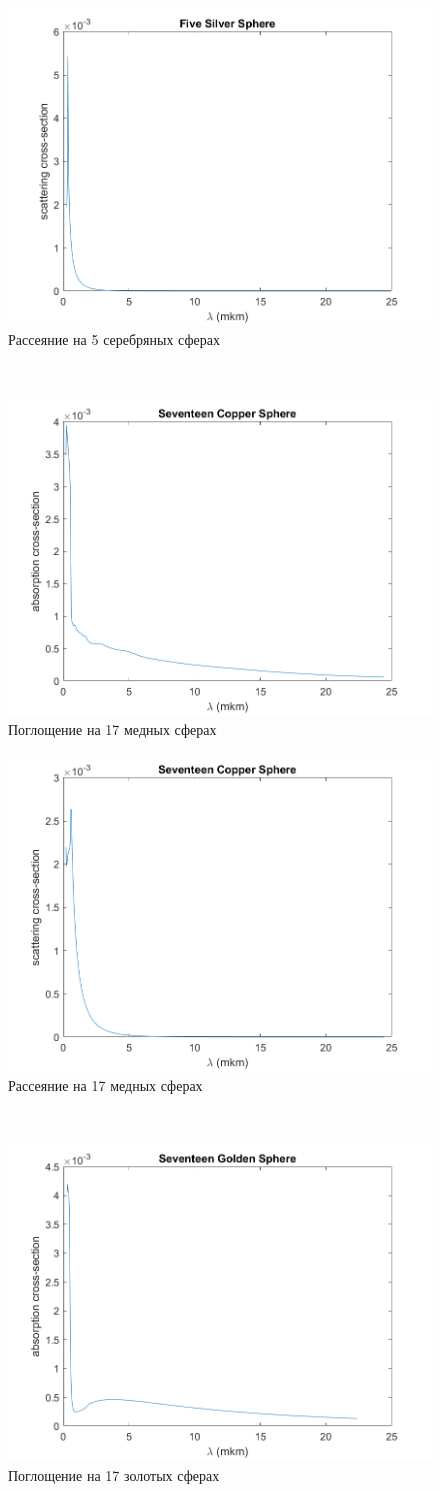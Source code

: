 \begin{figure}[h!]
	\centering
	\includegraphics[width=0.5\linewidth]{fiveSilverSphereCrossSection}
	\caption{Рассеяние на 5 серебряных сферах}
	\label{fig:fiveSilverSphereCrossSection}
\end{figure} \\
\begin{figure}[h!]
	\centering
	\includegraphics[width=0.5\linewidth]{seventeenCopperSphereAbsorptionSection}
	\caption{Поглощение на 17 медных сферах}
	\label{fig:seventeenCopperSphereAbsorptionSection}
\end{figure} 
\begin{figure}[h!]
	\centering
	\includegraphics[width=0.5\linewidth]{seventeenCopperSphereCrossSection}
	\caption{Рассеяние на 17 медных сферах}
	\label{fig:seventeenCopperSphereCrossSection}
\end{figure} \\
\begin{figure}[h!]
	\centering
	\includegraphics[width=0.5\linewidth]{seventeenGoldSphereAbsorptionSection}
	\caption{Поглощение на 17 золотых сферах}
	\label{fig:seventeenGoldSphereAbsorptionSection}
\end{figure} 
